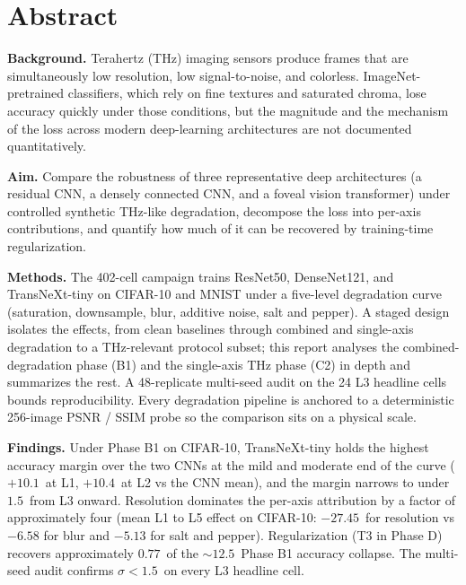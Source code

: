 \section*{Abstract}

\noindent\textbf{Background.}\quad
Terahertz (THz) imaging sensors produce frames that are simultaneously low
resolution, low signal-to-noise, and colorless. ImageNet-pretrained
classifiers, which rely on fine textures and saturated chroma, lose
accuracy quickly under those conditions, but the magnitude and the
mechanism of the loss across modern deep-learning architectures are not
documented quantitatively.

\noindent\textbf{Aim.}\quad
Compare the robustness of three representative deep architectures (a
residual CNN, a densely connected CNN, and a foveal vision transformer)
under controlled synthetic THz-like degradation, decompose the loss into
per-axis contributions, and quantify how much of it can be recovered by
training-time regularization.

\noindent\textbf{Methods.}\quad
The 402-cell campaign trains ResNet50, DenseNet121, and TransNeXt-tiny
on CIFAR-10 and MNIST under a five-level degradation curve (saturation,
downsample, blur, additive noise, salt and pepper). A staged design
isolates the effects, from clean baselines through combined and
single-axis degradation to a THz-relevant protocol subset; this report
analyses the combined-degradation phase (B1) and the single-axis THz
phase (C2) in depth and summarizes the rest. A 48-replicate multi-seed
audit on the 24 L3 headline cells bounds reproducibility. Every
degradation pipeline is anchored to a deterministic 256-image PSNR / SSIM
probe so the comparison sits on a physical scale.

\noindent\textbf{Findings.}\quad
Under Phase B1 on CIFAR-10, TransNeXt-tiny holds the highest accuracy
margin over the two CNNs at the mild and moderate end of the curve
($+10.1\,$\Mpp{} at L1, $+10.4\,$\Mpp{} at L2 vs the CNN mean), and the
margin narrows to under $1.5\,$\Mpp{} from L3 onward. Resolution
dominates the per-axis attribution by a factor of approximately four
(mean L1 to L5 effect on CIFAR-10: $-27.45\,$\Mpp{} for resolution vs
$-6.58$ for blur and $-5.13$ for salt and pepper). Regularization (T3 in
Phase D) recovers approximately $0.77\,$\Mpp{} of the $\sim 12.5\,$\Mpp{}
Phase B1 accuracy collapse. The multi-seed audit confirms
$\sigma < 1.5\,$\Mpp{} on every L3 headline cell.

